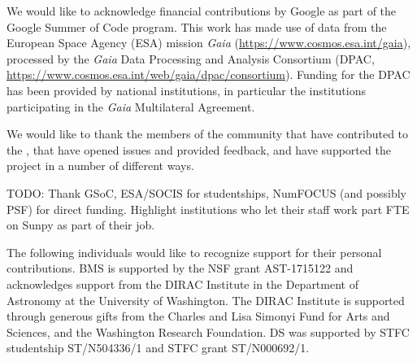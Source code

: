 \acknowledgments

We would like to acknowledge financial contributions by Google as part of the Google Summer of Code program.
This work has made use of data from the European Space Agency (ESA) mission {\it Gaia} (\url{https://www.cosmos.esa.int/gaia}), processed by the {\it Gaia} Data Processing and Analysis Consortium (DPAC, \url{https://www.cosmos.esa.int/web/gaia/dpac/consortium}).
Funding for the DPAC has been provided by national institutions, in particular the institutions participating in the {\it Gaia} Multilateral Agreement.

We would like to thank the members of the community that have contributed to the \sunpyproj, that have opened issues and provided feedback, and have supported the project in a number of different ways.

TODO: Thank GSoC, ESA/SOCIS for studentships, NumFOCUS (and possibly PSF) for direct funding.
Highlight institutions who let their staff work part FTE on Sunpy as part of their job.

The following individuals would like to recognize support for their personal contributions.
BMS is supported by the NSF grant AST-1715122 and acknowledges support from the DIRAC Institute in the Department of Astronomy at the University of Washington.
The DIRAC Institute is supported through generous gifts from the Charles and Lisa Simonyi Fund for Arts and Sciences, and the Washington Research Foundation.
DS was supported by STFC studentship ST/N504336/1 and STFC grant ST/N000692/1.
